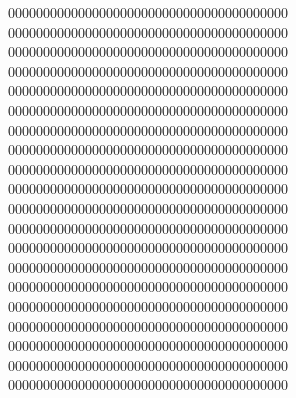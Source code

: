 0000000000000000000000000000000000000000
0000000000000000000000000000000000000000
0000000000000000000000000000000000000000
0000000000000000000000000000000000000000
0000000000000000000000000000000000000000
0000000000000000000000000000000000000000
0000000000000000000000000000000000000000
0000000000000000000000000000000000000000
0000000000000000000000000000000000000000
0000000000000000000000000000000000000000
0000000000000000000000000000000000000000
0000000000000000000000000000000000000000
0000000000000000000000000000000000000000
0000000000000000000000000000000000000000
0000000000000000000000000000000000000000
0000000000000000000000000000000000000000
0000000000000000000000000000000000000000
0000000000000000000000000000000000000000
0000000000000000000000000000000000000000
0000000000000000000000000000000000000000
